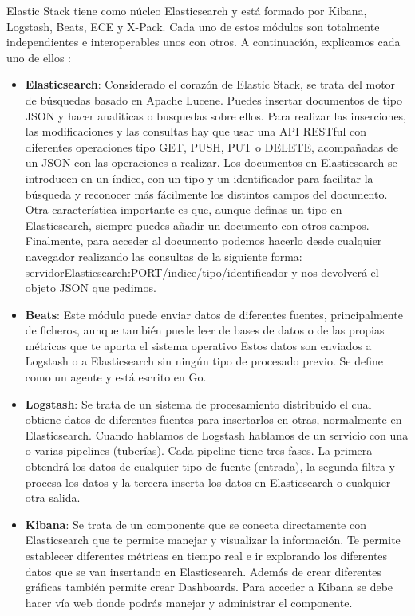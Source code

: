 Elastic Stack tiene como núcleo Elasticsearch y está formado por Kibana, Logstash, Beats, ECE y X-Pack. Cada uno de estos módulos son totalmente independientes e interoperables unos con otros. A continuación, explicamos cada uno de ellos \cite{Elk-4}:
\begin{itemize}
	\item \textbf{Elasticsearch}: Considerado el corazón de Elastic Stack, se trata del motor de búsquedas basado en Apache Lucene. Puedes insertar documentos de tipo JSON y hacer analiticas o busquedas sobre ellos. Para realizar las inserciones, las modificaciones y las consultas hay que usar una API RESTful con diferentes operaciones tipo GET, PUSH, PUT o DELETE, acompañadas de un JSON con las operaciones a realizar. Los documentos en Elasticsearch se introducen en un índice, con un tipo y un identificador para facilitar la búsqueda y reconocer más fácilmente los distintos campos del documento. Otra característica importante es que, aunque definas un tipo en Elasticsearch, siempre puedes añadir un documento con otros campos. Finalmente, para acceder al documento podemos hacerlo desde cualquier navegador realizando las consultas de la siguiente forma: servidorElasticsearch:PORT/indice/tipo/identificador y nos devolverá el objeto JSON que pedimos.
	\item \textbf{Beats}: Este módulo puede enviar datos de diferentes fuentes, principalmente de ficheros, aunque también puede leer de bases de datos o de las propias métricas que te aporta el sistema operativo Estos datos son enviados a Logstash o a Elasticsearch sin ningún tipo de procesado previo. Se define como un agente y está escrito en Go.
	\item \textbf{Logstash}: Se trata de un sistema de procesamiento distribuido el cual obtiene datos de diferentes fuentes para insertarlos en otras, normalmente en Elasticsearch. Cuando hablamos de Logstash hablamos de un servicio con una o varias pipelines (tuberías). Cada pipeline tiene tres fases. La primera obtendrá los datos de cualquier tipo de fuente (entrada), la segunda filtra y procesa los datos y la tercera inserta los datos en Elasticsearch o cualquier otra salida.
	\item \textbf{Kibana}: Se trata de un componente que se conecta directamente con Elasticsearch que te permite manejar y visualizar la información. Te permite establecer diferentes métricas en tiempo real e ir explorando los diferentes datos que se van insertando en Elasticsearch. Además de crear diferentes gráficas también permite crear Dashboards. Para acceder a Kibana se debe hacer vía web donde podrás manejar y administrar el componente.

\end{itemize}
